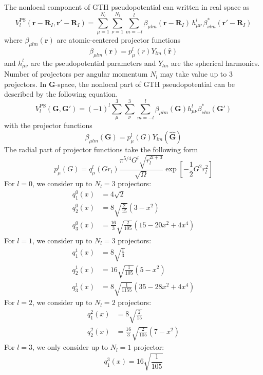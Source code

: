 \documentclass[a4paper,10pt]{article}
\begin{document}
The nonlocal component of GTH pseudopotential can written in real space as
\begin{equation}
V^{\mathrm{PS}}_{l}(\mathbf{r}-\mathbf{R}_{I},\mathbf{r}'-\mathbf{R}_{I}) =
\sum_{\mu=1}^{N_{l}} \sum_{\nu=1}^{N_{l}} \sum_{m=-l}^{l}
\beta_{\mu lm}(\mathbf{r}-\mathbf{R}_{I})\,
h^{l}_{\mu\nu}\,
\beta^{*}_{\nu lm}(\mathbf{r}'-\mathbf{R}_{I})
\end{equation}
where $\beta_{\mu lm}(\mathbf{r})$ are atomic-centered projector functions
\begin{equation}
\beta_{\mu lm}(\mathbf{r}) =
p^{l}_{\mu}(r) Y_{lm}(\hat{\mathbf{r}})
\label{eq:proj_NL_R}
\end{equation}
%
and $h^{l}_{\mu\nu}$ are the pseudopotential parameters and
$Y_{lm}$ are the spherical harmonics. Number of projectors per angular
momentum $N_{l}$ may take value up to 3 projectors.
%
In $\mathbf{G}$-space, the nonlocal part of GTH pseudopotential can be described by
the following equation.
\begin{equation}
V^{\mathrm{PS}}_{l}(\mathbf{G},\mathbf{G}') =
(-1)^{l} \sum_{\mu}^{3} \sum_{\nu}^{3}\sum_{m=-l}^{l}
\beta_{\mu l m}(\mathbf{G}) h^{l}_{\mu\nu}
\beta^{*}_{\nu l m}(\mathbf{G}')
\end{equation}
with the projector functions
\begin{equation}
\beta_{\mu lm}(\mathbf{G}) = p^{l}_{\mu}(G) Y_{lm}(\hat{\mathbf{G}})
\label{eq:betaNL_G}
\end{equation}
The radial part of projector functions take the following form
\begin{equation}
p^{l}_{\mu}(G) = q^{l}_{\mu}\left(Gr_{l}\right)
\frac{\pi^{5/4}G^{l}\sqrt{ r_{l}^{2l+3}}}{\sqrt{\Omega}}
\exp\left[-\frac{1}{2}G^{2}r^{2}_{l}\right]
\label{eq:proj_NL_G}
\end{equation}
%
For $l=0$, we consider up to $N_{l}=3$ projectors:
\begin{align}
q^{0}_{1}(x) & = 4\sqrt{2} \\
q^{0}_{2}(x) & = 8\sqrt{\frac{2}{15}}(3 - x^2) \\
q^{0}_{3}(x) & = \frac{16}{3}\sqrt{\frac{2}{105}} (15 - 20x^2 + 4x^4)
\end{align}
%
For $l=1$, we consider up to $N_{l}=3$ projectors:
\begin{align}
q^{1}_{1}(x) & = 8 \sqrt{\frac{1}{3}} \\
q^{1}_{2}(x) & = 16 \sqrt{\frac{1}{105}} (5 - x^2) \\
q^{1}_{3}(x) & = 8 \sqrt{\frac{1}{1155}} (35 - 28x^2 + 4x^4)
\end{align}
%
For $l=2$, we consider up to $N_{l}=2$ projectors:
\begin{align}
q^{2}_{1}(x) & = 8\sqrt{\frac{2}{15}} \\
q^{2}_{2}(x) & = \frac{16}{3} \sqrt{\frac{2}{105}}(7 - x^2)
\end{align}
%
For $l=3$, we only consider up to $N_{l}=1$ projector:
\begin{equation}
q^{3}_{1}(x) = 16\sqrt{\frac{1}{105}}
\end{equation}
\end{document}
